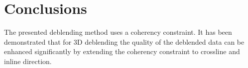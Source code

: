 \FloatBarrier


\section{Conclusions}

The presented deblending method uses a coherency constraint. It has been demonstrated that for 3D deblending the quality of the deblended data can be enhanced significantly by extending the coherency constraint to crossline and inline direction.


















